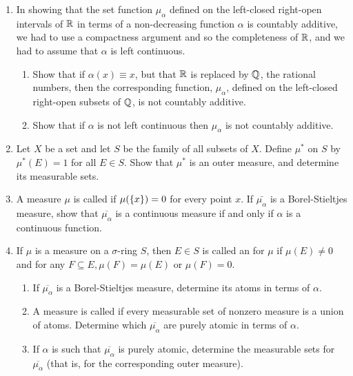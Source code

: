 \begin{enumerate}[label=\arabic*),ref=\arabic*]
\item In showing that the set function $\mu_\alpha$ defined on the left-closed right-open intervals of $\mathbb{R}$ in terms of a non-decreasing function $\alpha$ is countably additive, we had to use a compactness argument and so the completeness of $\mathbb{R}$, and we had to assume that $\alpha$ is left continuous.

\begin{enumerate}
\item Show that if $\alpha(x) \equiv x$, but that $\mathbb{R}$ is replaced by $\mathbb{Q}$, the rational numbers, then the corresponding function, $\mu_\alpha$, defined on the left-closed right-open subsets of $\mathbb{Q}$, is not countably additive.
\item Show that if $\alpha$ is not left continuous then $\mu_\alpha$ is not countably additive.
\end{enumerate}

\item\label{exer:empty meas sets}
Let $X$ be a set and let $S$ be the family of all subsets of $X$. Define $\mu^*$ on $S$ by $\mu^*(E)=1$ for all $E\in S$. Show that $\mu^*$ is an outer measure, and determine its measurable sets.

\item A measure $\mu$ is called  if $\mu(\left\{x\right\})=0$ for every point $x$. If $\bar{\mu_\alpha}$ is a Borel-Stieltjes measure, show that $\overline{\mu_\alpha}$ is a continuous measure if and only if $\alpha$ is a continuous function.

\item If $\mu$ is a measure on a $\sigma$-ring $S$, then $E \in S$ is called an  for $\mu$ if $\mu(E) \neq 0$ and for any $F \subseteq E, \mu(F)=\mu(E)$ or $\mu(F)=0$.
\begin{enumerate}
\item If $\overline{\mu_\alpha}$ is a Borel-Stieltjes measure, determine its atoms in terms of $\alpha$.
\item A measure is called  if every measurable set of nonzero measure is a union of atoms. Determine which $\overline{\mu_\alpha}$ are purely atomic in terms of $\alpha$.
\item If $\alpha$ is such that $\overline{\mu_\alpha}$ is purely atomic, determine the measurable sets for $\overline{\mu_\alpha}$ (that is, for the corresponding outer measure).
\end{enumerate}



\end{enumerate}
